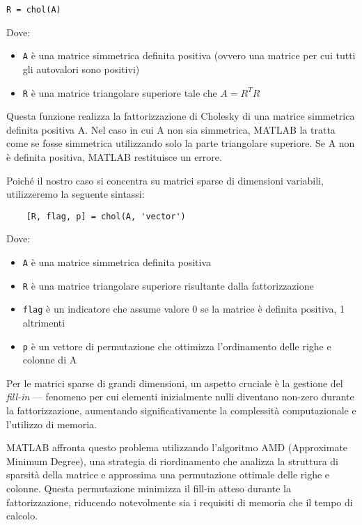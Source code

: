 \begin{verbatim}
R = chol(A)   
\end{verbatim}

Dove: 
\begin{itemize}
    \item \texttt{A} è una matrice simmetrica definita positiva (ovvero una matrice per cui tutti gli autovalori sono positivi)
    \item \texttt{R} è una matrice triangolare superiore tale che $A = R^T R$
\end{itemize}

Questa funzione realizza la fattorizzazione di Cholesky di una matrice simmetrica definita positiva A.
Nel caso in cui A non sia simmetrica, MATLAB la tratta come se fosse simmetrica utilizzando solo la parte triangolare superiore.
Se A non è definita positiva, MATLAB restituisce un errore.

Poiché il nostro caso si concentra su matrici sparse di dimensioni variabili, utilizzeremo la seguente sintassi:

\begin{verbatim}
    [R, flag, p] = chol(A, 'vector')
\end{verbatim}
Dove: 
\begin{itemize}
    \item \texttt{A} è una matrice simmetrica definita positiva
    \item \texttt{R} è una matrice triangolare superiore risultante dalla fattorizzazione
    \item \texttt{flag} è un indicatore che assume valore 0 se la matrice è definita positiva, 1 altrimenti
    \item \texttt{p} è un vettore di permutazione che ottimizza l'ordinamento delle righe e colonne di A
\end{itemize}

Per le matrici sparse di grandi dimensioni, un aspetto cruciale è la gestione del \textit{fill-in} 
— fenomeno per cui elementi inizialmente nulli diventano non-zero durante la fattorizzazione, 
aumentando significativamente la complessità computazionale e l'utilizzo di memoria.

MATLAB affronta questo problema utilizzando l'algoritmo AMD (Approximate Minimum Degree), 
una strategia di riordinamento che analizza la struttura di sparsità della matrice 
e approssima una permutazione ottimale delle righe e colonne. 
Questa permutazione minimizza il fill-in atteso durante la fattorizzazione, 
riducendo notevolmente sia i requisiti di memoria che il tempo di calcolo.


